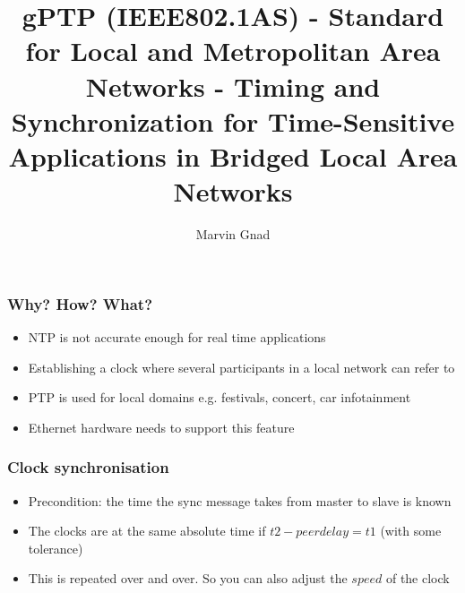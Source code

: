 \documentclass{beamer}
\title{gPTP (IEEE802.1AS) - Standard for Local and Metropolitan Area Networks - Timing and Synchronization for Time-Sensitive Applications in Bridged Local Area Networks}
\author{Marvin Gnad}
\begin{document}
\frame{\titlepage}

\begin{frame}
\frametitle{Why? How? What?}
\begin{itemize}
    \item NTP is not accurate enough for real time applications
    \item Establishing a clock where several participants in a local network can refer to
    \item PTP is used for local domains e.g. festivals, concert, car infotainment
    \item Ethernet hardware needs to support this feature
\end{itemize}
\end{frame}

\begin{frame}
\frametitle{Clock synchronisation}
\begin{center}
\end{center}
\begin{itemize}
    \item Precondition: the time the sync message takes from master to slave is known
    \item The clocks are at the same absolute time if $t2 - peerdelay = t1$ (with some tolerance)
    \item This is repeated over and over. So you can also adjust the $speed$ of the clock
\end{itemize}
\end{frame}
\end{document}
